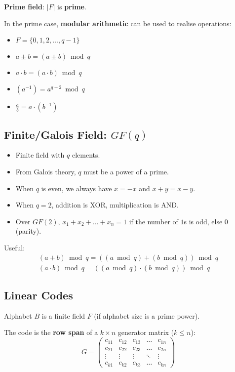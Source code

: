 \documentclass[11pt]{article}
\begin{document}
\textbf{Prime field}: $\lvert F \rvert$ is \textbf{prime}.

In the prime case, \textbf{modular arithmetic} can be used to realise operations:
\begin{itemize}
  \item $F = \{ 0, 1, 2, \ldots, q - 1 \}$
  \item $a \pm b = (a \pm b) \bmod q$
  \item $a \cdot b = (a \cdot b) \bmod q$
  \item $(a^{-1}) = a^{q - 2} \bmod q$
  \item $\frac{a}{b} = a \cdot (b^{-1})$
\end{itemize}

\subsection{Finite/Galois Field: $GF(q)$}
\begin{itemize}
  \item Finite field with $q$ elements.
  \item From Galois theory, $q$ must be a power of a prime.
  \item When $q$ is even, we always have $x = -x$ and $x + y = x - y$.
  \item When $q = 2$, addition is XOR, multiplication is AND.
  \item Over $GF(2)$, $x_1 + x_2 + \ldots + x_n = 1$ if the number of $1$s is odd, else 0 (parity).
\end{itemize}

Useful:
\begin{align*}
  (a + b) \bmod q = ((a \bmod q) + (b \bmod q)) \bmod q \\
  (a \cdot b) \bmod q = ((a \bmod q) \cdot (b \bmod q)) \bmod q
\end{align*}

\subsection{Linear Codes}
Alphabet $B$ is a finite field $F$ (if alphabet size is a prime power).

The code is the \textbf{row span} of a $k \times n$ generator matrix ($k \leq n$):
\[
  G = 
  \begin{pmatrix}
    c_{11} & c_{12} & c_{13} & \dots  & c_{1n} \\
    c_{21} & c_{22} & c_{23} & \dots  & c_{2n} \\
    \vdots & \vdots & \vdots & \ddots & \vdots \\
    c_{k1} & c_{k2} & c_{k3} & \dots  & c_{kn}
  \end{pmatrix}
\]
\end{document}
